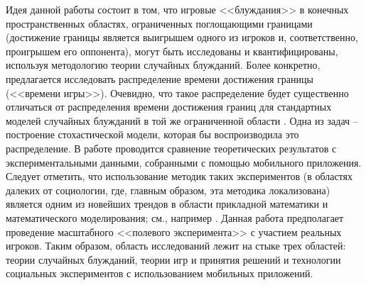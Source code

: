 Идея данной работы состоит в том, что игровые <<блуждания>> в конечных пространственных областях, ограниченных поглощающими границами 
(достижение границы является выигрышем одного из игроков и, соответственно, проигрышем его оппонента), 
могут быть исследованы и квантифицированы, используя методологию теории случайных блужданий. Более конкретно, 
предлагается исследовать распределение времени достижения границы (<<времени игры>>). Очевидно, что такое распределение 
будет существенно отличаться от распределения времени достижения границ для стандартных моделей случайных блужданий 
в той же ограниченной области \cite{grebenkov_universal_2016}. Одна из задач -- построение стохастической модели, которая бы воспроизводила это распределение. 
В работе проводится сравнение теоретических результатов с экспериментальными данными, собранными с помощью мобильного приложения. 
Следует отметить, что использование методик таких экспериментов (в областях далеких от социологии, где, главным образом, эта методика локализована) 
является одним из новейших трендов в области прикладной математики и математического моделирования; 
см., например \cite{kearns_experimental_2006, shirado_locally_2017, lynn_human_2020}.
Данная работа предполагает проведение масштабного <<полевого эксперимента>> с участием реальных игроков. 
Таким образом, область исследований лежит на стыке трех областей: теории случайных блужданий, теории игр и принятия решений 
и технологии социальных экспериментов с использованием мобильных приложений. 


\ifsynopsis
\else
\fi

